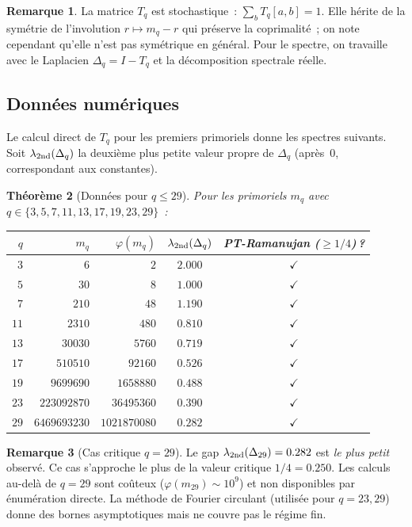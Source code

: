 \documentclass[11pt,a4paper]{article}
\newtheorem{theorem}{Théorème}[section]
\theoremstyle{definition}
\newtheorem{remark}[theorem]{Remarque}
\begin{document}
\begin{remark}
La matrice $T_q$ est stochastique~: $\sum_b T_q[a,b] = 1$. Elle hérite
de la symétrie de l'involution $r\mapsto m_q - r$ qui préserve la
coprimalité~; on note cependant qu'elle n'est pas symétrique en général.
Pour le spectre, on travaille avec le Laplacien
$\Delta_q = I - T_q$ et la décomposition spectrale réelle.
\end{remark}

\subsection{Données numériques}

Le calcul direct de $T_q$ pour les premiers primoriels donne
les spectres suivants. Soit $\lambda_{\rm 2nd}(\Delta_q)$ la
deuxième plus petite valeur propre de $\Delta_q$ (après~$0$,
correspondant aux constantes).

\begin{theorem}[Données pour $q\leq 29$]
\label{thm:data_q29}
Pour les primoriels $m_q$ avec $q\in\{3,5,7,11,13,17,19,23,29\}$~:
\begin{center}
\renewcommand{\arraystretch}{1.2}
\begin{tabular}{rrrcc}
\toprule
$q$ & $m_q$ & $\varphi(m_q)$ & $\lambda_{\rm 2nd}(\Delta_q)$ &
PT-Ramanujan ($\geq 1/4$)\,? \\
\midrule
$3$  & $6$           & $2$         & $2.000$ & $\checkmark$ \\
$5$  & $30$          & $8$         & $1.000$ & $\checkmark$ \\
$7$  & $210$         & $48$        & $1.190$ & $\checkmark$ \\
$11$ & $2310$        & $480$       & $0.810$ & $\checkmark$ \\
$13$ & $30030$       & $5760$      & $0.719$ & $\checkmark$ \\
$17$ & $510510$      & $92160$     & $0.526$ & $\checkmark$ \\
$19$ & $9699690$     & $1658880$   & $0.488$ & $\checkmark$ \\
$23$ & $223092870$   & $36495360$  & $0.390$ & $\checkmark$ \\
$29$ & $6469693230$  & $1021870080$& $0.282$ & $\checkmark$ \\
\bottomrule
\end{tabular}
\end{center}
\end{theorem}

\begin{remark}[Cas critique $q=29$]
Le gap $\lambda_{\rm 2nd}(\Delta_{29}) = 0.282$ est \emph{le plus
petit} observé. Ce cas s'approche le plus de la valeur critique
$1/4 = 0.250$. Les calculs au-delà de $q=29$ sont coûteux
($\varphi(m_{29}) \sim 10^9$) et non disponibles par énumération
directe. La méthode de Fourier circulant (utilisée pour $q=23,29$)
donne des bornes asymptotiques mais ne couvre pas le régime fin.
\end{remark}
\end{document}
